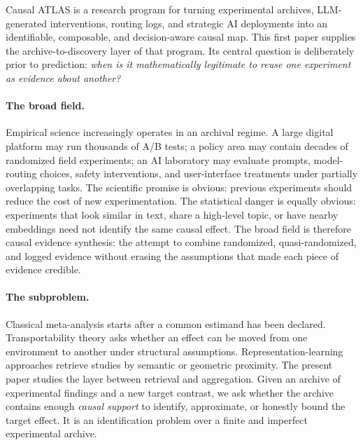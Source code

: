 \documentclass[11pt]{article}
\numberwithin{equation}{section}
\newcommand{\1}{\mathbf 1}
\begin{document}
Causal ATLAS is a research program for turning experimental archives, LLM-generated interventions, routing logs, and strategic AI deployments into an identifiable, composable, and decision-aware causal map.  This first paper supplies the archive-to-discovery layer of that program.  Its central question is deliberately prior to prediction: \emph{when is it mathematically legitimate to reuse one experiment as evidence about another?}

\paragraph{The broad field.}
Empirical science increasingly operates in an archival regime.  A large digital platform may run thousands of A/B tests; a policy area may contain decades of randomized field experiments; an AI laboratory may evaluate prompts, model-routing choices, safety interventions, and user-interface treatments under partially overlapping tasks.  The scientific promise is obvious: previous experiments should reduce the cost of new experimentation.  The statistical danger is equally obvious: experiments that look similar in text, share a high-level topic, or have nearby embeddings need not identify the same causal effect.  The broad field is therefore causal evidence synthesis: the attempt to combine randomized, quasi-randomized, and logged evidence without erasing the assumptions that made each piece of evidence credible.

\paragraph{The subproblem.}
Classical meta-analysis starts after a common estimand has been declared.  Transportability theory asks whether an effect can be moved from one environment to another under structural assumptions.  Representation-learning approaches retrieve studies by semantic or geometric proximity.  The present paper studies the layer between retrieval and aggregation.  Given an archive of experimental findings and a new target contrast, we ask whether the archive contains enough \emph{causal support} to identify, approximate, or honestly bound the target effect.  It is an identification problem over a finite and imperfect experimental archive.
\end{document}
